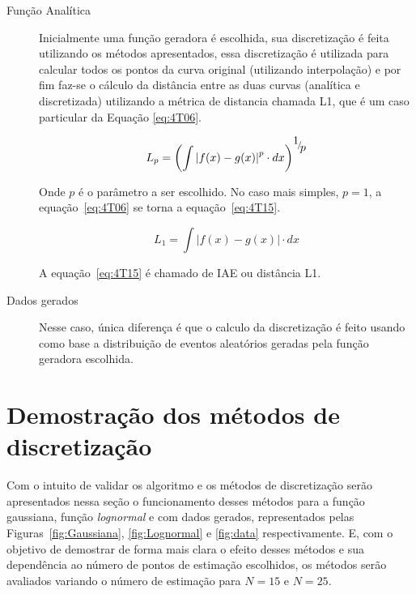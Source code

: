 \begin{description}
	\item[Função Analítica] Inicialmente uma função geradora é escolhida, sua discretização é feita utilizando os métodos apresentados, essa discretização é utilizada para calcular todos os pontos da curva original (utilizando interpolação) e por fim faz-se o cálculo da distância entre as duas curvas (analítica e discretizada) utilizando a métrica de distancia chamada L1, que é um caso particular da Equação \eqref{eq:4T06}.
	
	\begin{equation}\label{eq:4T06}
	{L_p} = {\left( {\int {{{\left| {f(x) - g(x)} \right|}^p}}\cdot dx } \right)^{{\raise0.7ex\hbox{$1$} \!\mathord{\left/
					{\vphantom {1 p}}\right.\kern-\nulldelimiterspace}
				\!\lower0.7ex\hbox{$p$}}}}
	\end{equation}
	
	Onde $p$ é o parâmetro a ser escolhido. No caso mais simples, $p=1$, a equação~\eqref{eq:4T06} se torna a equação~\eqref{eq:4T15}.
	
	\begin{equation}\label{eq:4T15}
	{L_1} = {\int {\left| {f(x) - g(x)} \right|} \cdot dx}
	\end{equation}
	
	A equação~\eqref{eq:4T15} é chamado de \ac{IAE} ou distância L1.
	
	\item[Dados gerados] Nesse caso, única diferença é que o calculo da discretização é feito usando como base a distribuição de eventos aleatórios geradas pela função geradora escolhida.
\end{description}


\section{Demostração dos métodos de discretização}

Com o intuito de validar os algoritmo e os métodos de discretização serão apresentados nessa seção o funcionamento desses métodos para a função gaussiana, função \textit{lognormal} e com dados gerados, representados pelas Figuras~\ref{fig:Gaussiana}, \ref{fig:Lognormal} e \ref{fig:data} respectivamente. E, com o objetivo de demostrar de forma mais clara o efeito desses métodos e sua dependência ao número de pontos de estimação escolhidos, os métodos serão avaliados variando o número de estimação para $ N = 15 $ e $ N = 25 $.

